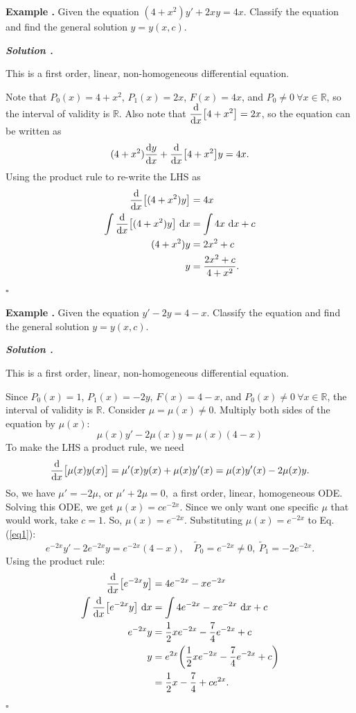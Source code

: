 \documentclass[12pt, a4paper]{article}
\newcounter{index}[subsection]
\newenvironment*{eg}{\begin{framed}\par\noindent\textbf{Example \thesubsection.\stepcounter{index}\theindex}}{\par\end{framed}}
\newcounter{nprf}[subsection]
\newenvironment*{sol}{\par\indent\textbf{\textit{Solution \stepcounter{nprf}\thenprf.}}\par}{\hfill{$\square$}\par}
\def\R{{\mathbb{R}}}
\def\d{{\mathrm{d}}}
\def\dsst{\displaystyle}
\begin{document}
\begin{eg}
	Given the equation $(4+x^2)y'+2xy=4x$. Classify the equation and find the general solution $y=y(x,c)$.
	\begin{sol}
		This is a first order, linear, non-homogeneous differential equation.\par
		Note that $P_0(x)=4+x^2$, $P_1(x)=2x$, $F(x)=4x$, and $P_0\neq0\ \forall x\in\R$, so the interval of validity is $\R$. Also note that $\dsst\dv{x}\qty\big[4+x^2]=2x$, so the equation can be written as \[(4+x^2)\dv{y}{x}+\dv{x}\qty\big[4+x^2]y=4x.\] Using the product rule to re-write the LHS as \[\begin{aligned}\dv{x}\qty\big[(4+x^2)y]&=4x\\\int\dv{x}\qty\big[(4+x^2)y]\ \d x&=\int 4x\ \d x+c\\(4+x^2)y&=2x^2+c\\y&=\dfrac{2x^2+c}{4+x^2}.\end{aligned}\]
	\end{sol}
\end{eg}
\begin{eg}
	Given the equation $y'-2y=4-x$. Classify the equation and find the general solution $y=y(x,c)$.
	\begin{sol}
		This is a first order, linear, non-homogeneous differential equation.\par
		Since $P_0(x)=1$, $P_1(x)=-2y$, $F(x)=4-x$, and $P_0(x)\neq0\ \forall x\in\R$, the interval of validity is $\R$. Consider $\mu=\mu(x)\neq0$. Multiply both sides of the equation by $\mu(x)$: \begin{equation}\label{eq1}\mu(x)y'-2\mu(x)y=\mu(x)(4-x)\end{equation} To make the LHS a product rule, we need \[\dv{x}\qty\big[\mu(x)y(x)]=\mu'(x)y(x)+\mu(x)y'(x)=\mu(x)y'(x)-2\mu(x)y.\] So, we have $\mu'=-2\mu$, or $\mu'+2\mu=0,$ a first order, linear, homogeneous ODE. Solving this ODE, we get $\mu(x)=ce^{-2x}$. Since we only want one specific $\mu$ that would work, take $c=1$. So, $\mu(x)=e^{-2x}$. Substituting $\mu(x)=e^{-2x}$ to Eq. (\ref{eq1}): \[e^{-2x}y'-2e^{-2x}y=e^{-2x}(4-x),\quad\widetilde{P}_0=e^{-2x}\neq0,\ \widetilde{P}_1=-2e^{-2x}.\] Using the product rule: \[\begin{aligned}\dv{x}\qty[e^{-2x}y]&=4e^{-2x}-xe^{-2x}\\\int\dv{x}\qty[e^{-2x}y]\ \d x&=\int 4e^{-2x}-xe^{-2x}\ \d x+c\\e^{-2x}y&=\dfrac{1}{2}xe^{-2x}-\dfrac{7}{4}e^{-2x}+c\\y&=e^{2x}\qty(\dfrac{1}{2}xe^{-2x}-\dfrac{7}{4}e^{-2x}+c)\\&=\dfrac{1}{2}x-\dfrac{7}{4}+ce^{2x}.\end{aligned}\]
	\end{sol}
\end{eg}
\end{document}
